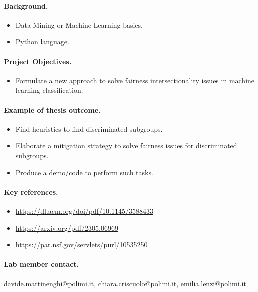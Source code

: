 \documentclass[a4paper,11pt]{article}
\begin{document}
\paragraph{Background.}
\begin{itemize}[nosep]
  \item Data Mining or Machine Learning basics.
  \item Python language.
\end{itemize}

\paragraph{Project Objectives.}
\begin{itemize}[nosep]
  \item Formulate a new approach to solve fairness intersectionality issues in machine learning classification.
\end{itemize}

\paragraph{Example of thesis outcome.}
\begin{itemize}[nosep]
  \item Find heuristics to find discriminated subgroups.
  \item Elaborate a mitigation strategy to solve fairness issues for discriminated subgroups.
  \item Produce a demo/code to perform such tasks.
\end{itemize}

\paragraph{Key references.}
\begin{itemize}[nosep]
  \item \url{https://dl.acm.org/doi/pdf/10.1145/3588433}
  \item \url{https://arxiv.org/pdf/2305.06969}
  \item \url{https://par.nsf.gov/servlets/purl/10535250}
\end{itemize}

\paragraph{Lab member contact.}
\url{davide.martinenghi@polimi.it}, \url{chiara.criscuolo@polimi.it}, \url{emilia.lenzi@polimi.it}
\end{document}
